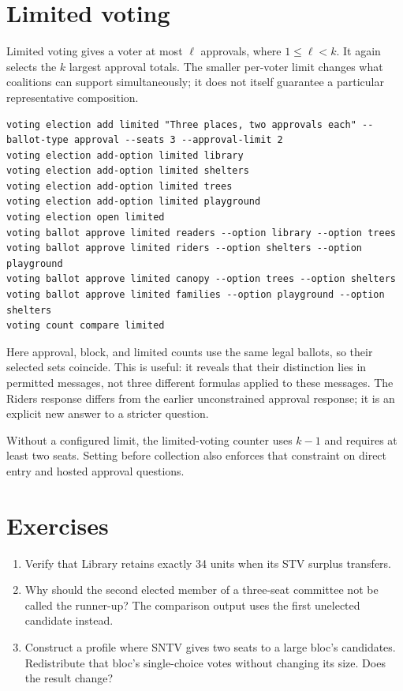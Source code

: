 \section{Limited voting}
Limited voting gives a voter at most $\ell$ approvals, where $1\leq\ell<k$. It again selects the $k$ largest approval totals. The smaller per-voter limit changes what coalitions can support simultaneously; it does not itself guarantee a particular representative composition.
\begin{lstlisting}[style=votingrun]
voting election add limited "Three places, two approvals each" --ballot-type approval --seats 3 --approval-limit 2
voting election add-option limited library
voting election add-option limited shelters
voting election add-option limited trees
voting election add-option limited playground
voting election open limited
voting ballot approve limited readers --option library --option trees
voting ballot approve limited riders --option shelters --option playground
voting ballot approve limited canopy --option trees --option shelters
voting ballot approve limited families --option playground --option shelters
voting count compare limited
\end{lstlisting}
Here approval, block, and limited counts use the same legal ballots, so their selected sets coincide. This is useful: it reveals that their distinction lies in permitted messages, not three different formulas applied to these messages. The Riders response differs from the earlier unconstrained approval response; it is an explicit new answer to a stricter question.

Without a configured limit, the limited-voting counter uses $k-1$ and requires at least two seats. Setting  before collection also enforces that constraint on direct entry and hosted approval questions.

\section{Exercises}
\begin{enumerate}
\item Verify that Library retains exactly 34 units when its STV surplus transfers.
\item Why should the second elected member of a three-seat committee not be called the runner-up? The comparison output uses the first unelected candidate instead.
\item Construct a profile where SNTV gives two seats to a large bloc's candidates. Redistribute that bloc's single-choice votes without changing its size. Does the result change?
\end{enumerate}
